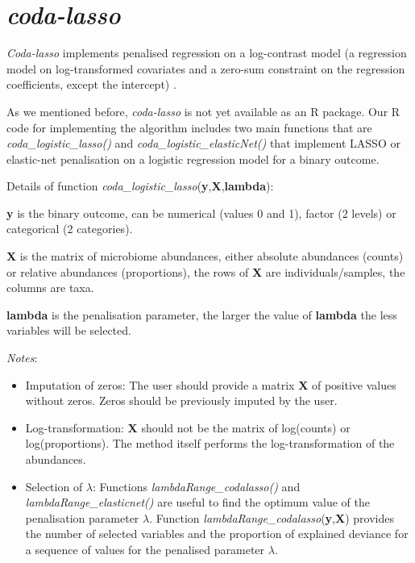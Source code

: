 \documentclass[openany]{book}
\providecommand{\tightlist}{%
  \setlength{\itemsep}{0pt}\setlength{\parskip}{0pt}}
\begin{document}
\chapter{\texorpdfstring{\emph{coda-lasso}}{coda-lasso}}\label{coda}

\emph{Coda-lasso} implements penalised regression on a log-contrast
model (a regression model on log-transformed covariates and a zero-sum
constraint on the regression coefficients, except the intercept)
\citep{lu2019generalized, lin2014variable}.

As we mentioned before, \emph{coda-lasso} is not yet available as an R
package. Our R code for implementing the algorithm includes two main
functions that are \emph{coda\_logistic\_lasso()} and
\emph{coda\_logistic\_elasticNet()} that implement LASSO or elastic-net
penalisation on a logistic regression model for a binary outcome.

Details of function
\emph{coda\_logistic\_lasso}(\textbf{y},\textbf{X},\textbf{lambda}):

\textbf{y} is the binary outcome, can be numerical (values 0 and 1),
factor (2 levels) or categorical (2 categories).

\textbf{X} is the matrix of microbiome abundances, either absolute
abundances (counts) or relative abundances (proportions), the rows of
\textbf{X} are individuals/samples, the columns are taxa.

\textbf{lambda} is the penalisation parameter, the larger the value of
\textbf{lambda} the less variables will be selected.

\emph{Notes}:

\begin{itemize}
\tightlist
\item
  Imputation of zeros: The user should provide a matrix \textbf{X} of
  positive values without zeros. Zeros should be previously imputed by
  the user.
\item
  Log-transformation: \textbf{X} should not be the matrix of log(counts)
  or log(proportions). The method itself performs the log-transformation
  of the abundances.
\item
  Selection of \(\lambda\): Functions \emph{lambdaRange\_codalasso()}
  and \emph{lambdaRange\_elasticnet()} are useful to find the optimum
  value of the penalisation parameter \(\lambda\). Function
  \emph{lambdaRange\_codalasso}(\textbf{y},\textbf{X}) provides the
  number of selected variables and the proportion of explained deviance
  for a sequence of values for the penalised parameter \(\lambda\).
\end{itemize}
\end{document}
